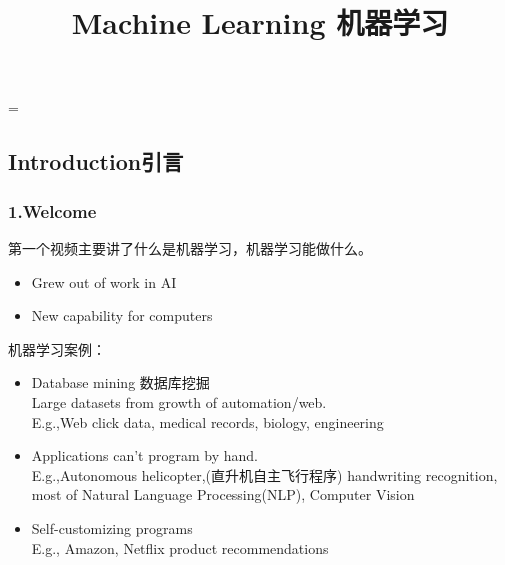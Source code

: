 \documentclass{article}
\begin{document}
 
\hfuzz=\maxdimen
{}
\begin{CJK}{UTF8}{gbsn}  
\title{Machine Learning 机器学习}
\author{}
\date{}
\maketitle
\part{Introduction引言}
\section*{1.Welcome}
\subparagraph*{}
 第一个视频主要讲了什么是机器学习，机器学习能做什么。
\begin{itemize}
  \item Grew out of work in AI
  \item New capability for computers
\end{itemize}
\subparagraph*{}
 机器学习案例：
\begin{itemize}
  \item Database mining 数据库挖掘\\
   Large datasets from growth of automation/web.\\
   E.g.,Web click data, medical records, biology, engineering
  \item Applications can't program by hand.\\
   E.g.,Autonomous helicopter,(直升机自主飞行程序) handwriting recognition, most of Natural Language Processing(NLP), Computer Vision
  \item Self-customizing programs\\
   E.g., Amazon, Netflix product recommendations
\end{itemize}

\end{CJK}
\end{document}
